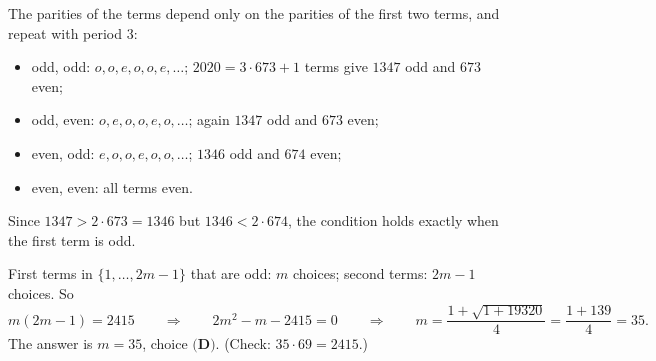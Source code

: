The parities of the terms depend only on the parities of the first two terms, and repeat with period $3$:
\begin{itemize}
\item odd, odd: $o,o,e,o,o,e,\dots$; $2020=3\cdot673+1$ terms give $1347$ odd and $673$ even;
\item odd, even: $o,e,o,o,e,o,\dots$; again $1347$ odd and $673$ even;
\item even, odd: $e,o,o,e,o,o,\dots$; $1346$ odd and $674$ even;
\item even, even: all terms even.
\end{itemize}
Since $1347>2\cdot673=1346$ but $1346<2\cdot674$, the condition holds exactly when the first term is odd.

First terms in $\{1,\dots,2m-1\}$ that are odd: $m$ choices; second terms: $2m-1$ choices. So
\[m(2m-1)=2415\qquad\Longrightarrow\qquad2m^2-m-2415=0\qquad\Longrightarrow\qquad m=\dfrac{1+\sqrt{1+19320}}{4}=\dfrac{1+139}{4}=35.\]
The answer is $m=\boxed{35}$, choice $\textbf{(D)}$. (Check: $35\cdot69=2415$.)
